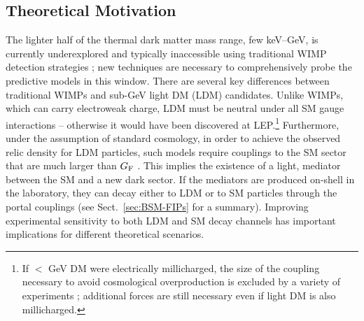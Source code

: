 \documentclass[../report.tex]{subfiles}
\begin{document}
\subsection{Theoretical Motivation}
The lighter half of the thermal dark matter  mass range, few keV--GeV, is currently underexplored and typically inaccessible using traditional WIMP detection strategies \cite{Battaglieri:2017aum}; new techniques are necessary to comprehensively probe the predictive models in this window.
There are several key differences between traditional WIMPs and sub-GeV light DM (LDM) candidates. Unlike WIMPs, which can carry electroweak charge, LDM must be neutral under all SM gauge interactions -- otherwise it would have been discovered at LEP.\footnote{If $<$ GeV  DM were electrically millicharged, the size of the coupling necessary to avoid cosmological  overproduction is excluded by a variety of experiments \cite{Davidson:2000hf,Berlin:2018sjs}; additional forces are still necessary even if light DM is also millicharged.}
Furthermore, under the assumption of standard cosmology, in order to achieve the observed relic density for LDM particles, such models require couplings to the SM sector that are much larger than $G_{\rm F}$ \cite{Lee:1977ua}. This implies the existence of a light, %
mediator between the SM and a new dark sector. If the mediators 
are produced on-shell in the laboratory, they can decay either to LDM or to SM particles through the  portal couplings (see Sect.~\ref{sec:BSM-FIPs} for a summary). Improving experimental sensitivity to both LDM and SM decay channels has important implications for different theoretical scenarios.
\end{document}
